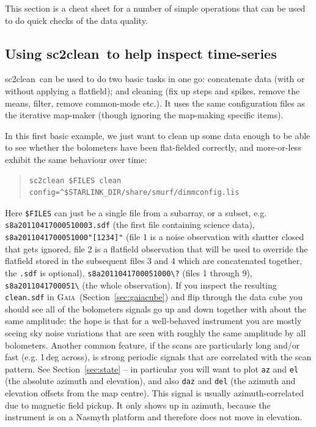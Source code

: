 \documentclass[twoside,11pt]{article}
\newcommand{\xref}[3]{#1}
\renewcommand{\_}{\texttt{\symbol{95}}}
\newenvironment{myquote}{\begin{quote}\begin{small}}{\end{small}\end{quote}}
\newcommand{\gaia}{\xref{\textsc{Gaia}}{sun214}{}}
\newcommand{\task}[1]{\textsf{#1}}
\newcommand{\clean}{\xref{\task{sc2clean}}{sun258}{SC2CLEAN}}
\begin{document}
This section is a cheat sheet for a number of simple operations that
can be used to do quick checks of the data quality.

\subsection{\label{clean}Using \clean\ to help inspect time-series}

\clean\ can be used to do two basic tasks in one go: concatenate data
(with or without applying a flatfield); and cleaning (fix up steps and
spikes, remove the means, filter, remove common-mode etc.). It uses
the same configuration files as the iterative map-maker (though
ignoring the map-making specific items).

In this first basic example, we just want to clean up some data enough
to be able to see whether the bolometers have been flat-fielded
correctly, and more-or-less exhibit the same behaviour over time:

\begin{myquote}
\begin{verbatim}
sc2clean $FILES clean config=^$STARLINK_DIR/share/smurf/dimmconfig.lis
\end{verbatim}
\end{myquote}

Here \texttt{\$FILES} can just be a single file from a subarray, or a
subset, e.g. \texttt{s8a20110417\_00051\_0003.sdf} (the first file
containing science data), \texttt{s8a20110417\_00051\_000"[1234]"}
(file 1 is a noise observation with shutter closed that gets ignored,
file 2 is a flatfield observation that will be used to override the
flatfield stored in the subsequent files 3 and 4 which are
concatenated together, the \texttt{.sdf} is optional),
\texttt{s8a20110417\_00051\_000\textbackslash?} (files 1 through 9),
\texttt{s8a20110417\_00051\_\textbackslash*} (the whole
observation). If you inspect the resulting \texttt{clean.sdf} in
\gaia\ (Section~\ref{sec:gaiacube}) and flip through the data cube you
should see all of the bolometers signals go up and down together with
about the same amplitude: the hope is that for a well-behaved
instrument you are mostly seeing sky noise variations that are seen
with roughly the same amplitude by all bolometers. Another common
feature, if the scans are particularly long and/or fast (e.g. 1\,deg
across), is strong periodic signals that are correlated with the scan
pattern. See Section~\ref{sec:state} -- in particular you will want to
plot \texttt{az} and \texttt{el} (the absolute azimuth and elevation),
and also \texttt{daz} and \texttt{del} (the azimuth and elevation
offsets from the map centre). This signal is usually
azimuth-correlated due to magnetic field pickup. It only shows up in
azimuth, because the instrument is on a Nasmyth platform and therefore
does not move in elevation.
\end{document}
